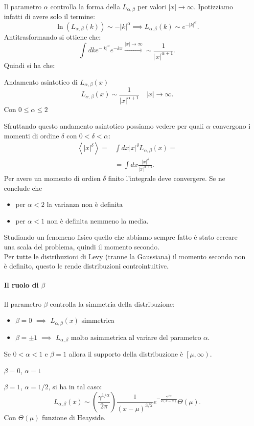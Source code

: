 Il parametro $\alpha$ controlla la forma della $L_{\alpha,\beta  }$ per valori $\left|x\right|\to \infty$. Ipotizziamo infatti di avere solo il termine:
\[
    \ln (L_{\alpha,\beta  }(k) ) \sim -\left|k\right|^\alpha \implies  L_{\alpha, \beta  }(k) \sim e^{-\left|k\right|^\alpha}
.\] 
Antitrasformando si ottiene che:
\[
    \int_{}^{} dk e^{-\left|k\right|^\alpha} e^{-kx} \xrightarrow[]{\left|x\right|\to \infty} \sim \frac{1}{\left|x\right|^{\alpha +1}}
.\] 
Quindi si ha che:
\begin{bluebox}{Andamento asintotico di $L_{\alpha,\beta  }(x)$}
   \[
       L_{\alpha,\beta  }(x) \sim \frac{1}{\left|x\right|^{\alpha +1}} \quad \left|x\right|\to \infty
   .\]  
   Con $0\le  \alpha \le 2$ 
\end{bluebox}
\noindent
Sfruttando questo andamento asintotico possiamo vedere per quali $\alpha$ convergono i momenti di ordine $\delta$ con $0<\delta <\alpha$:
\[\begin{aligned}
    \left<\left|x\right|^\delta\right> = & \int dx \left|x\right|^\delta L_{\alpha,\beta  }(x) =\\
					 & = \int  dx \frac{\left|x\right|^\delta}{\left|x\right|^{\alpha +1}}
.\end{aligned}\]
Per avere un momento di ordien $\delta$ finito l'integrale deve convergere.
Se ne conclude che 
\begin{itemize}
    \item per $\alpha <2$ la varianza non è definita
    \item per $\alpha <1$ non è definita nemmeno la media.
\end{itemize}
Studiando un fenomeno fisico quello che abbiamo sempre fatto è stato cercare una scala del problema, quindi il momento secondo. \\
Per tutte le distribuzioni di Levy (tranne la Gaussiana) il momento secondo non è definito, questo le rende distribuzioni controintuitive.
\paragraph{Il ruolo di $\beta  $}%
\label{par:Il ruolo di beta}
Il parametro $\beta  $   controlla la simmetria della distribuzione:
\begin{itemize}
    \item $\beta =0$ $\implies$ $L_{\alpha,\beta  }(x) $ simmetrica
    \item $\beta  = \pm 1$ $\implies$ $L_{\alpha,\beta  }$ molto asimmetrica al variare del parametro $\alpha$. 
\end{itemize}
Se $0<\alpha <1$ e $\beta =1$ allora il supporto della distribuzione è $\left[\mu,\infty\right)$.
\begin{exmp}[Lorentziana]
    $\beta =0$, $\alpha =1$ 
    
\end{exmp}
\noindent
\begin{exmp}
    $\beta =1$, $\alpha =1 /2$, si ha in tal caso:
    \[
	L_{\alpha,\beta  }(x) \sim \left(\frac{\gamma^{1 /\alpha}}{2\pi}\right) 
	\frac{1}{\left(x-\mu\right)^{3 /2}} e^{-\frac{\gamma^{1 /\alpha}}{2\left(x-\mu\right)}} \Theta (\mu) 
    .\] 
    Con $\Theta (\mu) $ funzione di Heayside.
    
\end{exmp}
\noindent
